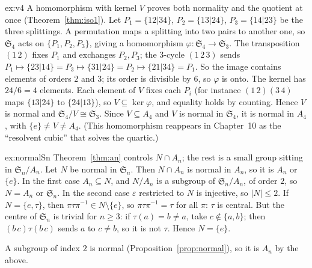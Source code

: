 \begin{solution}{ex:v4}
\idea A homomorphism with kernel $V$ proves both normality and the quotient at once (Theorem~\ref{thm:iso1}).
\writeup Let $P_1=\{12|34\}$, $P_2=\{13|24\}$, $P_3=\{14|23\}$ be the three splittings. A permutation maps a splitting into two pairs to another one, so $\mathfrak S_4$ acts on $\{P_1,P_2,P_3\}$, giving a homomorphism $\varphi:\mathfrak S_4\to\mathfrak S_3$. The transposition $(1\,2)$ fixes $P_1$ and exchanges $P_2,P_3$; the $3$-cycle $(1\,2\,3)$ sends $P_1\mapsto\{23|14\}=P_3\mapsto\{31|24\}=P_2\mapsto\{21|34\}=P_1$. So the image contains elements of orders $2$ and $3$; its order is divisible by $6$, so $\varphi$ is onto. The kernel has $24/6=4$ elements. Each element of $V$ fixes each $P_i$ (for instance $(1\,2)(3\,4)$ maps $\{13|24\}$ to $\{24|13\}$), so $V\subseteq\ker\varphi$, and equality holds by counting. Hence $V$ is normal and $\mathfrak S_4/V\cong\mathfrak S_3$. Since $V\subseteq A_4$ and $V$ is normal in $\mathfrak S_4$, it is normal in $A_4$, with $\{e\}\ne V\ne A_4$. (This homomorphism reappears in Chapter~10 as the ``resolvent cubic'' that solves the quartic.)
\end{solution}

\begin{solution}{ex:normalSn}
\idea Theorem~\ref{thm:an} controls $N\cap A_n$; the rest is a small group sitting in $\mathfrak S_n/A_n$.
\writeup Let $N$ be normal in $\mathfrak S_n$. Then $N\cap A_n$ is normal in $A_n$, so it is $A_n$ or $\{e\}$. In the first case $A_n\subseteq N$, and $N/A_n$ is a subgroup of $\mathfrak S_n/A_n$, of order $2$, so $N=A_n$ or $\mathfrak S_n$. In the second case $\varepsilon$ restricted to $N$ is injective, so $|N|\le2$. If $N=\{e,\tau\}$, then $\pi\tau\pi^{-1}\in N\setminus\{e\}$, so $\pi\tau\pi^{-1}=\tau$ for all $\pi$: $\tau$ is central. But the centre of $\mathfrak S_n$ is trivial for $n\ge3$: if $\tau(a)=b\ne a$, take $c\notin\{a,b\}$; then $(b\,c)\tau(b\,c)$ sends $a$ to $c\ne b$, so it is not $\tau$. Hence $N=\{e\}$.

A subgroup of index $2$ is normal (Proposition~\ref{prop:normal}), so it is $A_n$ by the above.
\end{solution}

